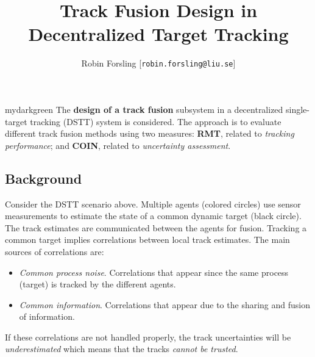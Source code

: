 \documentclass[a0paper,portrait,twocols]{def/LiUposter} %
\title{\Huge{\bfseries Track Fusion Design in Decentralized Target Tracking} } %
\author{Robin Forsling [\texttt{robin.forsling@liu.se}]}
\institute{Division of Automatic Control} %
\begin{document}
%





{\begin{minipage}{\columnwidth} 


\vspace{-3em}





\begin{mybox}[title={Summary}]{mydarkgreen}
The \textbf{design of a track fusion} subsystem in a decentralized single-target tracking (DSTT) system is considered. The approach is to evaluate different track fusion methods using two measures: \textbf{RMT}, related to \emph{tracking performance}; and \textbf{COIN}, related to \emph{uncertainty assessment}.
\end{mybox}




\subsection{Background}

\begin{center}
	\begin{tikzpicture}[scale=.9]
		
	\end{tikzpicture}	
\end{center}

Consider the DSTT scenario above. Multiple agents (colored circles) use sensor measurements to estimate the state of a common dynamic target (black circle). The track estimates are communicated between the agents for fusion. Tracking a common target implies correlations between local track estimates. The main sources of correlations are:
\begin{itemize}
	\item \emph{Common process noise}. Correlations that appear since the same process (target) is tracked by the different agents.
	\item \emph{Common information}. Correlations that appear due to the sharing and fusion of information. 
\end{itemize} 
If these correlations are not handled properly, the track uncertainties will be \emph{\textcolor{myorange}{underestimated}} which means that the tracks \emph{\textcolor{myorange}{cannot be trusted}}.





\end{minipage}}
\end{document}
